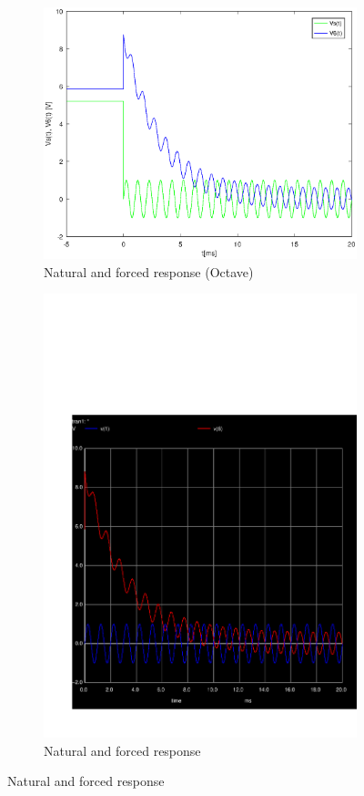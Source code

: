 \begin{figure}[h] \centering

\begin{subfigure}{0.4\textwidth}
\includegraphics[width=\textwidth]{Solution.eps}
\caption{Natural and forced response (Octave)}
\label{fig:first}
\end{subfigure}
\begin{subfigure}{0.4\textwidth}
\includegraphics[width=\textwidth]{sim4.pdf}
\caption{Natural and forced response}
\label{fig:second}
\end{subfigure}

\end{figure}

